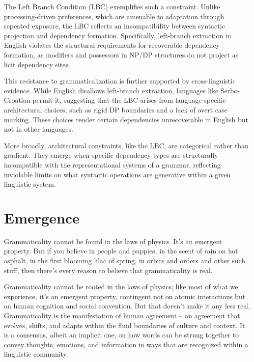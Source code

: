 The Left Branch Condition (LBC) exemplifies such a constraint. Unlike processing-driven preferences, which are amenable to adaptation through repeated exposure, the LBC reflects an incompatibility between syntactic projection and dependency formation. Specifically, left-branch extraction in English violates the structural requirements for recoverable dependency formation, as modifiers and possessors in NP/DP structures do not project as licit dependency sites.

This resistance to grammaticalization is further supported by cross-linguistic evidence. While English disallows left-branch extraction, languages like Serbo-Croatian permit it, suggesting that the LBC arises from language-specific architectural choices, such as rigid DP boundaries and a lack of overt case marking. These choices render certain dependencies unrecoverable in English but not in other languages.

More broadly, architectural constraints, like the LBC, are categorical rather than gradient. They emerge when specific dependency types are structurally incompatible with the representational systems of a grammar, reflecting inviolable limits on what syntactic operations are generative within a given linguistic system.


\section{Emergence}

Grammaticality cannot be found in the laws of physics. It's an emergent property. But if you believe in people and puppies, in the scent of rain on hot asphalt, in the first blooming lilac of spring, in orbits and orders and other such stuff, then there's every reason to believe that grammaticality is real.

Grammaticality cannot be rooted in the laws of physics; like most of what we experience, it's an emergent property, contingent not on atomic interactions but on human cognition and social convention. But that doesn't make it any less real. Grammaticality is the manifestation of human agreement -- an agreement that evolves, shifts, and adapts within the fluid boundaries of culture and context. It is a consensus, albeit an implicit one, on how words can be strung together to convey thoughts, emotions, and information in ways that are recognized within a linguistic community.